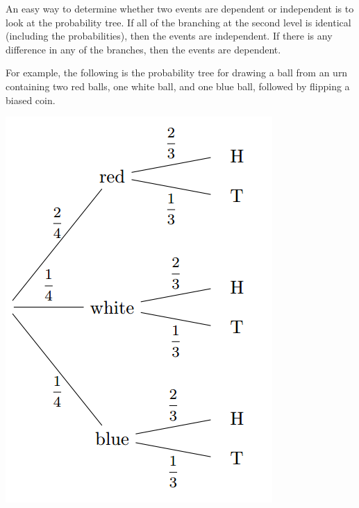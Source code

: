 \documentclass{ximera}
\begin{document}
An easy way to determine whether two events are dependent or independent is to look at the probability tree. If all of the branching at the second level is identical (including the probabilities), then the events are independent. If there is any difference in any of the branches, then the events are dependent.

For example, the following is the probability tree for drawing a ball from an urn containing two red balls, one white ball, and one blue ball, followed by flipping a biased coin.

\begin{image}
\includegraphics{ProbTree1.png}

\end{image}
\end{document}
